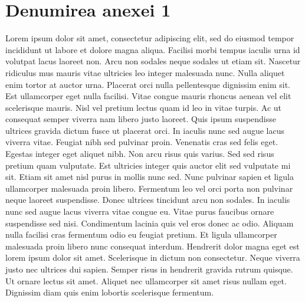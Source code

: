 \chapter{Denumirea anexei 1} 

Lorem ipsum dolor sit amet, consectetur adipiscing elit, sed do eiusmod tempor incididunt ut labore et dolore magna aliqua. Facilisi morbi tempus iaculis urna id volutpat lacus laoreet non. Arcu non sodales neque sodales ut etiam sit. Nascetur ridiculus mus mauris vitae ultricies leo integer malesuada nunc. Nulla aliquet enim tortor at auctor urna. Placerat orci nulla pellentesque dignissim enim sit. Est ullamcorper eget nulla facilisi. Vitae congue mauris rhoncus aenean vel elit scelerisque mauris. Nisl vel pretium lectus quam id leo in vitae turpis. Ac ut consequat semper viverra nam libero justo laoreet. Quis ipsum suspendisse ultrices gravida dictum fusce ut placerat orci. In iaculis nunc sed augue lacus viverra vitae. Feugiat nibh sed pulvinar proin. Venenatis cras sed felis eget. Egestas integer eget aliquet nibh. Non arcu risus quis varius. Sed sed risus pretium quam vulputate.
Est ultricies integer quis auctor elit sed vulputate mi sit. Etiam sit amet nisl purus in mollis nunc sed. Nunc pulvinar sapien et ligula ullamcorper malesuada proin libero. Fermentum leo vel orci porta non pulvinar neque laoreet suspendisse. Donec ultrices tincidunt arcu non sodales. In iaculis nunc sed augue lacus viverra vitae congue eu. Vitae purus faucibus ornare suspendisse sed nisi. Condimentum lacinia quis vel eros donec ac odio. Aliquam nulla facilisi cras fermentum odio eu feugiat pretium. Et ligula ullamcorper malesuada proin libero nunc consequat interdum. Hendrerit dolor magna eget est lorem ipsum dolor sit amet. Scelerisque in dictum non consectetur. Neque viverra justo nec ultrices dui sapien. Semper risus in hendrerit gravida rutrum quisque. Ut ornare lectus sit amet. Aliquet nec ullamcorper sit amet risus nullam eget. Dignissim diam quis enim lobortis scelerisque fermentum.